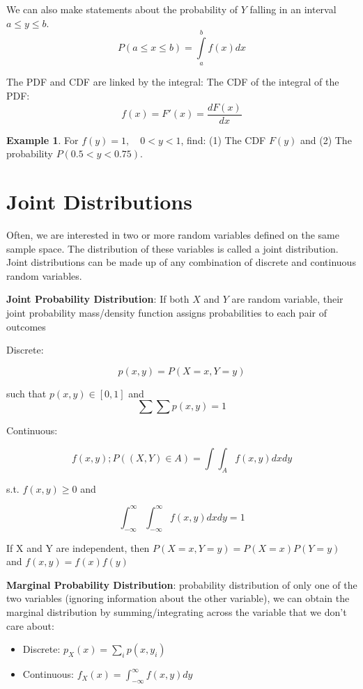 \documentclass[
]{book}
\providecommand{\tightlist}{%
  \setlength{\itemsep}{0pt}\setlength{\parskip}{0pt}}
\theoremstyle{definition}
\theoremstyle{definition}
\newtheorem{example}{Example}[chapter]
\theoremstyle{definition}
\theoremstyle{remark}
\begin{document}
We can also make statements about the probability of \(Y\) falling in an interval \(a\le y\le b\).
\[P(a\le x\le b)=\int\limits_a^b f(x)dx\]

The PDF and CDF are linked by the integral: The CDF of the integral of the PDF: \[f(x) = F'(x)=\frac{dF(x)}{dx}\]

\begin{example}
\protect\hypertarget{exm:unnamed-chunk-81}{}{\label{exm:unnamed-chunk-81} }
For \(f(y)=1, \quad 0<y<1\), find: (1) The CDF \(F(y)\) and (2) The probability \(P(0.5<y<0.75)\).
\end{example}

\hypertarget{joint-distributions}{%
\section{Joint Distributions}\label{joint-distributions}}

Often, we are interested in two or more random variables defined on the same sample space. The distribution of these variables is called a joint distribution. Joint distributions can be made up of any combination of discrete and continuous random variables.

\textbf{Joint Probability Distribution}: If both \(X\) and \(Y\) are random variable, their joint probability mass/density function assigns probabilities to each pair of outcomes

Discrete:

\[p(x, y) = P(X = x, Y = y)\]

such that \(p(x,y) \in [0,1]\) and \[\sum\sum p(x,y) = 1\]

Continuous:

\[f(x,y);P((X,Y) \in A) = \int\!\!\!\int_A f(x,y)dx dy \]

s.t. \(f(x,y)\ge 0\) and

\[\int_{-\infty}^\infty\int_{-\infty}^\infty f(x,y)dxdy = 1\]

If X and Y are independent, then \(P(X=x,Y=y) = P(X=x)P(Y=y)\) and \(f(x,y) = f(x)f(y)\)

\textbf{Marginal Probability Distribution}: probability distribution of only one of the two variables (ignoring information about the other variable), we can obtain the marginal distribution by summing/integrating across the variable that we don't care about:

\begin{itemize}
\tightlist
\item
  Discrete: \(p_X(x) = \sum_i p(x, y_i)\)
\item
  Continuous: \(f_X(x) = \int_{-\infty}^\infty f(x,y)dy\)
\end{itemize}
\end{document}

